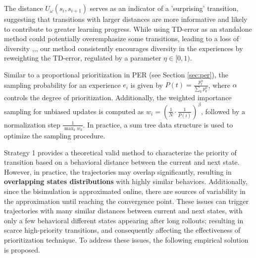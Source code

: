 The distance \(U_\omega(s_i, s_{i+1})\) serves as an indicator of a 'surprising' transition, suggesting that transitions with larger distances are more informative and likely to contribute to greater learning progress. While using TD-error as an standalone method could potentially overemphasize some transitions, leading to a loss of diversity \cite{schaul2015prioritized},\cite{pan2022understanding},\cite{fedus2020revisiting}, our method consistently encourages diversity in the experiences by reweighting the TD-error, regulated by a parameter $\eta \in [0,1)$.

Similar to a proportional prioritization in PER \cite{schaul2015prioritized} (see Section \ref{sec:per}), the sampling probability for an experience $e_i$ is given by $P(t) = \frac{p_t^\alpha}{\sum_k p_k^\alpha}$, where $\alpha$ controls the degree of prioritization. Additionally, the weighted importance sampling for unbiased updates is computed as $w_i = \left(\frac{1}{N} \cdot \frac{1}{P(i)} \right)^\beta$, followed by a normalization step $\frac{1}{\max_k w_k}$. In practice, a sum tree data structure is used to optimize the sampling procedure.

Strategy 1 provides a theoretical valid method to characterize the priority of transition based on a behavioral distance between the current and next state. However, in practice, the trajectories may overlap significantly, resulting in \textbf{overlapping states distributions} with highly similar behaviors. Additionally, since the bisimulation is approximated online, there are sources of variability in the approximation until reaching the convergence point. These issues can trigger trajectories with many similar distances between current and next states, with only a few behavioral different states appearing after long rollouts; resulting in scarce high-priority transitions, and consequently affecting the effectiveness of prioritization technique. To address these issues, the following empirical solution is proposed. 

